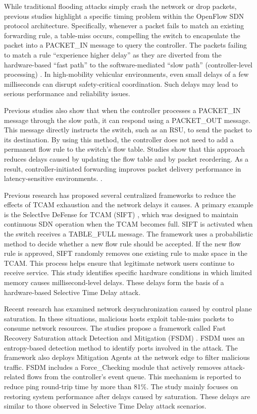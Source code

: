 \documentclass[12pt, a4paper]{report}
\begin{document}
While traditional flooding attacks simply crash the network or drop packets, previous studies highlight a specific timing problem within the OpenFlow SDN protocol architecture. Specifically, whenever a packet fails to match an existing forwarding rule, a table-miss occurs, compelling the switch to encapsulate the packet into a PACKET\_IN message to query the controller\cite{PASCOAL2020107223}. The packets failing to match a rule ``experience higher delay'' as they are diverted from the hardware-based ``fast path'' to the software-mediated ``slow path'' (controller-level processing) \cite{9356082} \cite{7929710}. In high-mobility vehicular environments, even small delays of a few milliseconds can disrupt safety-critical coordination. Such delays may lead to serious performance and reliability issues.

Previous studies also show that when the controller processes a PACKET\_IN message through the slow path, it can respond using a PACKET\_OUT message. This message directly instructs the switch, such as an RSU, to send the packet to its destination. By using this method, the controller does not need to add a permanent flow rule to the switch's flow table. Studies show that this approach reduces delays caused by updating the flow table and by packet reordering. As a result, controller-initiated forwarding improves packet delivery performance in latency-sensitive environments. \cite{PASCOAL2020107223} \cite{7929710}.

Previous research has proposed several centralized frameworks to reduce the effects of TCAM exhaustion and the network delays it causes. A primary example is the SelectIve DeFense for TCAM (SIFT) \cite{pascoal2017slow}, which was designed to maintain continuous SDN operation when the TCAM becomes full. SIFT is activated when the switch receives a TABLE\_FULL message. The framework uses a probabilistic method to decide whether a new flow rule should be accepted. If the new flow rule is approved, SIFT randomly removes one existing rule to make space in the TCAM. This process helps ensure that legitimate network users continue to receive service. This study identifies specific hardware conditions in which limited memory causes millisecond-level delays. These delays form the basis of a hardware-based Selective Time Delay attack.

Recent research has examined network desynchronization caused by control plane saturation. In these situations, malicious hosts exploit table-miss packets to consume network resources. The studies propose a framework called Fast Recovery Saturation attack Detection and Mitigation (FSDM) \cite{9356082}. FSDM uses an entropy-based detection method to identify ports involved in the attack. The framework also deploys Mitigation Agents at the network edge to filter malicious traffic. FSDM includes a Force\_Checking module that actively removes attack-related flows from the controller's event queue. This mechanism is reported to reduce ping round-trip time by more than 81\%. The study mainly focuses on restoring system performance after delays caused by saturation. These delays are similar to those observed in Selective Time Delay attack scenarios.
\end{document}

